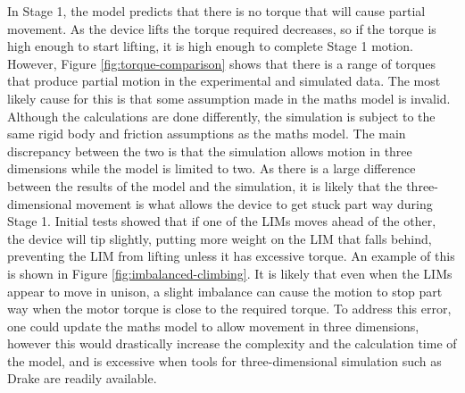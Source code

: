 In Stage 1, the model predicts that there is no torque that will cause partial movement. As the device lifts the torque required decreases, so if the torque is high enough to start lifting, it is high enough to complete Stage 1 motion. However, Figure \ref{fig:torque-comparison} shows that there is a range of torques that produce partial motion in the experimental and simulated data. The most likely cause for this is that some assumption made in the maths model is invalid. Although the calculations are done differently, the simulation is subject to the same rigid body and friction assumptions as the maths model. The main discrepancy between the two is that the simulation allows motion in three dimensions while the model is limited to two. As there is a large difference between the results of the model and the simulation, it is likely that the three-dimensional movement is what allows the device to get stuck part way during Stage 1. Initial tests showed that if one of the LIMs moves ahead of the other, the device will tip slightly, putting more weight on the LIM that falls behind, preventing the LIM from lifting unless it has excessive torque. An example of this is shown in Figure \ref{fig:imbalanced-climbing}. It is likely that even when the LIMs appear to move in unison, a slight imbalance can cause the motion to stop part way when the motor torque is close to the required torque. To address this error, one could update the maths model to allow movement in three dimensions, however this would drastically increase the complexity and the calculation time of the model, and is excessive when tools for three-dimensional simulation such as Drake are readily available.\\

